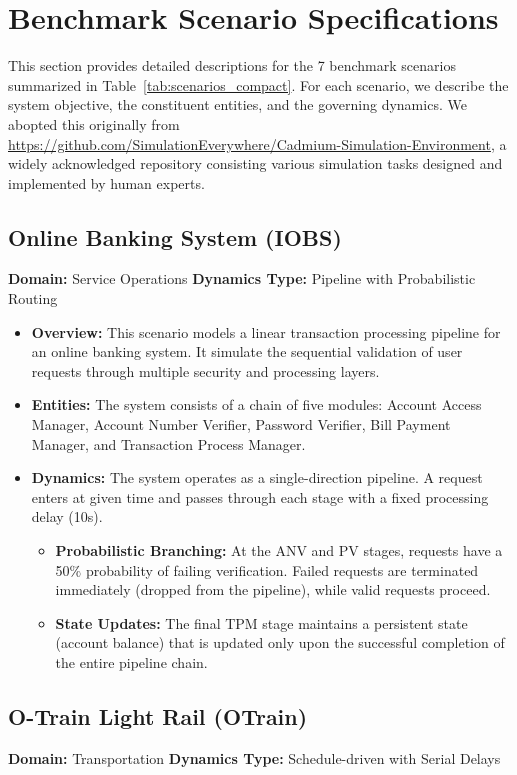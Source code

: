 \section{Benchmark Scenario Specifications}
\label{app:scenarios}


This section provides detailed descriptions for the 7 benchmark scenarios summarized in Table~\ref{tab:scenarios_compact}. For each scenario, we describe the system objective, the constituent entities, and the governing dynamics.
We abopted this originally from \url{https://github.com/SimulationEverywhere/Cadmium-Simulation-Environment}, a widely acknowledged repository consisting various simulation tasks designed and implemented by human experts.

\subsection{Online Banking System (IOBS)}
\textbf{Domain:} Service Operations 
\textbf{Dynamics Type:} Pipeline with Probabilistic Routing

\begin{itemize}[leftmargin=*]
\item \textbf{Overview:} This scenario models a linear transaction processing pipeline for an online banking system. It simulate the sequential validation of user requests through multiple security and processing layers. 
\item \textbf{Entities:} The system consists of a chain of five modules: Account Access Manager, Account Number Verifier, Password Verifier, Bill Payment Manager, and Transaction Process Manager.
\item \textbf{Dynamics:} The system operates as a single-direction pipeline. A request enters at given time and passes through each stage with a fixed processing delay (10s).
\begin{itemize}
\item \textbf{Probabilistic Branching:} At the ANV and PV stages, requests have a 50$\%$ probability of failing verification. Failed requests are terminated immediately (dropped from the pipeline), while valid requests proceed.
\item \textbf{State Updates:} The final TPM stage maintains a persistent state (account balance) that is updated only upon the successful completion of the entire pipeline chain.
\end{itemize}
\end{itemize}

\subsection{O-Train Light Rail (OTrain)}
\textbf{Domain:} Transportation 
\textbf{Dynamics Type:} Schedule-driven with Serial Delays

